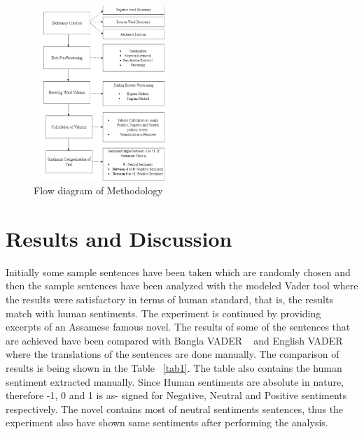\documentclass[conference]{IEEEtran}
\begin{document}
\begin{figure}[htbp]
    \begin{center}
        \includegraphics[width=2in]{proc.png}
        \caption{Flow diagram of Methodology}
        \label{fig:proc}
    \end{center}
\end{figure}

\section{Results and Discussion}

Initially some sample sentences have been taken which are randomly chosen and then the sample sentences have been analyzed with the modeled Vader tool where the results were satisfactory in terms of human standard, that is, the results match with human sentiments. The experiment is continued by providing excerpts of an Assamese famous novel. The results of some of the sentences that are achieved have been compared with Bangla VADER ~\cite{b2} and English VADER ~\cite{b3} where the translations of the sentences are done manually. The comparison of results is being shown in the Table ~\ref{tab1}. The table also contains the human sentiment extracted manually. Since Human sentiments are absolute in nature, therefore -1, 0 and 1 is as- signed for Negative, Neutral and Positive sentiments respectively. The novel contains most of neutral sentiments sentences, thus the experiment also have shown same sentiments after performing the analysis.
\end{document}
